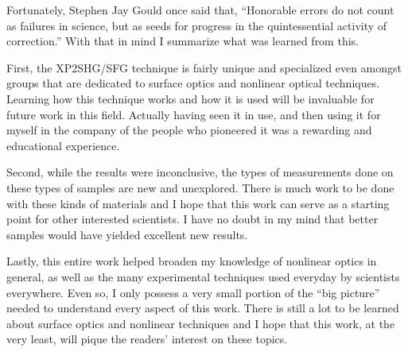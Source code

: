 Fortunately, Stephen Jay Gould once said that, ``Honorable errors do not count as failures in science, but as seeds for progress in the quintessential activity of correction.'' With that in mind I summarize what was learned from this.

First, the XP2SHG/SFG technique is fairly unique and specialized even amongst groups that are dedicated to surface optics and nonlinear optical techniques. Learning how this technique works and how it is used will be invaluable for future work in this field. Actually having seen it in use, and then using it for myself in the company of the people who pioneered it was a rewarding and educational experience.

Second, while the results were inconclusive, the types of measurements done on these types of samples are new and unexplored. There is much work to be done with these kinds of materials and I hope that this work can serve as a starting point for other interested scientists. I have no doubt in my mind that better samples would have yielded excellent new results.

Lastly, this entire work helped broaden my knowledge of nonlinear optics in general, as well as the many experimental techniques used everyday by scientists everywhere. Even so, I only possess a very small portion of the ``big picture'' needed to understand every aspect of this work. There is still a lot to be learned about surface optics and nonlinear techniques and I hope that this work, at the very least, will pique the readers' interest on these topics.
